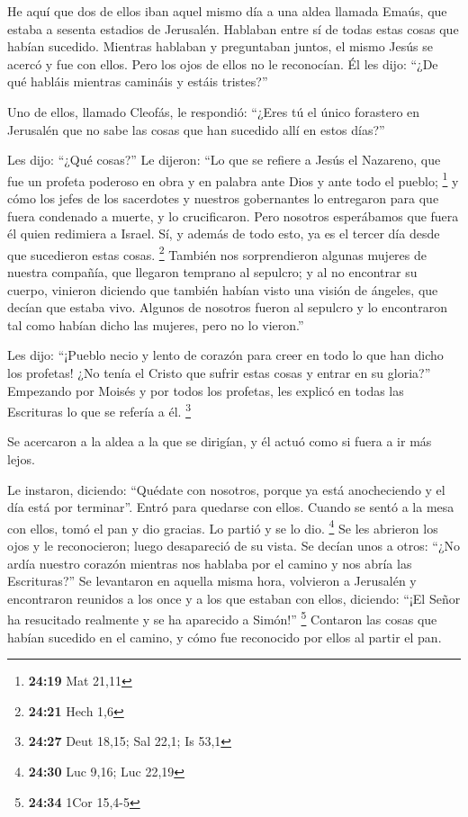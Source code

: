  He aquí que dos de ellos iban aquel mismo día a una
aldea llamada Emaús, que estaba a sesenta estadios de Jerusalén.
 Hablaban entre sí de todas estas cosas que habían
sucedido.  Mientras hablaban y preguntaban juntos, el
mismo Jesús se acercó y fue con ellos.  Pero los ojos de
ellos no le reconocían.  Él les dijo: ``¿De qué habláis
mientras camináis y estáis tristes?''

 Uno de ellos, llamado Cleofás, le respondió: ``¿Eres tú
el único forastero en Jerusalén que no sabe las cosas que han sucedido
allí en estos días?''

 Les dijo: ``¿Qué cosas?'' Le dijeron: ``Lo que se
refiere a Jesús el Nazareno, que fue un profeta poderoso en obra y en
palabra ante Dios y ante todo el pueblo; \footnote{\textbf{24:19} Mat
  21,11}  y cómo los jefes de los sacerdotes y nuestros
gobernantes lo entregaron para que fuera condenado a muerte, y lo
crucificaron.  Pero nosotros esperábamos que fuera él
quien redimiera a Israel. Sí, y además de todo esto, ya es el tercer día
desde que sucedieron estas cosas. \footnote{\textbf{24:21} Hech 1,6}
 También nos sorprendieron algunas mujeres de nuestra
compañía, que llegaron temprano al sepulcro;  y al no
encontrar su cuerpo, vinieron diciendo que también habían visto una
visión de ángeles, que decían que estaba vivo.  Algunos
de nosotros fueron al sepulcro y lo encontraron tal como habían dicho
las mujeres, pero no lo vieron.''

 Les dijo: ``¡Pueblo necio y lento de corazón para creer
en todo lo que han dicho los profetas!  ¿No tenía el
Cristo que sufrir estas cosas y entrar en su gloria?'' 
Empezando por Moisés y por todos los profetas, les explicó en todas las
Escrituras lo que se refería a él. \footnote{\textbf{24:27} Deut 18,15;
  Sal 22,1; Is 53,1}

 Se acercaron a la aldea a la que se dirigían, y él actuó
como si fuera a ir más lejos.

 Le instaron, diciendo: ``Quédate con nosotros, porque ya
está anocheciendo y el día está por terminar''. Entró para quedarse con
ellos.  Cuando se sentó a la mesa con ellos, tomó el pan
y dio gracias. Lo partió y se lo dio. \footnote{\textbf{24:30} Luc 9,16;
  Luc 22,19}  Se les abrieron los ojos y le reconocieron;
luego desapareció de su vista.  Se decían unos a otros:
``¿No ardía nuestro corazón mientras nos hablaba por el camino y nos
abría las Escrituras?''  Se levantaron en aquella misma
hora, volvieron a Jerusalén y encontraron reunidos a los once y a los
que estaban con ellos,  diciendo: ``¡El Señor ha
resucitado realmente y se ha aparecido a Simón!'' \footnote{\textbf{24:34}
  1Cor 15,4-5}  Contaron las cosas que habían sucedido en
el camino, y cómo fue reconocido por ellos al partir el pan.

